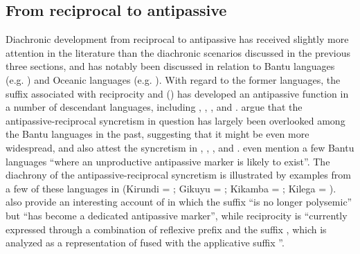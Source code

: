 \subsection{From reciprocal to antipassive} \label{diachrony:recp2antp}
Diachronic development from reciprocal to antipassive has received slightly more attention in the literature than the diachronic scenarios discussed in the previous three sections, and has notably been discussed in relation to Bantu languages (e.g. \citealt{bostoen:al:2015}) and Oceanic languages (e.g. \citealt{janic:2016}). With regard to the former languages, the  suffix  associated with reciprocity and  () has developed an antipassive function in a number of descendant languages, including  \citep[272ff.]{ndayiragije:2006}, ,  \citep[297f.]{nedjalkov:2007d}, and  \citep[755]{creissels:2018}. \citet[731f., 738ff.]{bostoen:al:2015} argue that the antipassive-reciprocal syncretism in question has largely been overlooked among the Bantu languages in the past, suggesting that it might be even more widespread, and also attest the syncretism in , , , and . \citet[742ff.]{bostoen:al:2015} even mention a few Bantu languages “where an unproductive antipassive marker is likely to exist”. The diachrony of the antipassive-reciprocal syncretism is illustrated by examples from a few of these languages in  (Kirundi = \citealt[275]{ndayiragije:2006}; Gikuyu = \citealt[163f.]{mugane:1999}; Kikamba = \citealt[39]{kioko:2005}; Kilega = \citealt[136f.]{botne:2003}). \citet[741]{bostoen:al:2015} also provide an interesting account of  in which the suffix  “is no longer polysemic” but “has become a dedicated antipassive marker”, while reciprocity is “currently expressed through a combination of reflexive prefix  and the suffix , which is analyzed as a representation of  fused with the applicative suffix ”.

